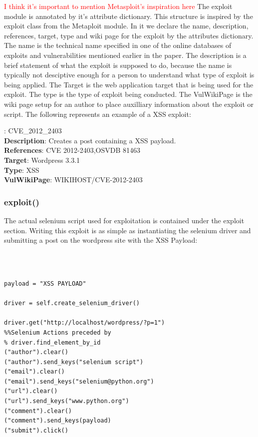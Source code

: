 \documentclass[letterpaper,twocolumn,10pt]{article}
\begin{document}
\textcolor{red}{I think it's important to mention Metasploit's inspiration here}
The exploit module is annotated by it's attribute dictionary. This structure is inspired by the exploit class from the Metaploit module. In it we declare the name, description, references, target, type and wiki page for the exploit by the attributes dictionary.  The name is the technical name specified in one of the online databases of exploits and vulnerabilities mentioned earlier in the paper.  The description is a brief statement of what the exploit is supposed to do, because the name is typically not desciptive enough for a person to understand what type of exploit is being applied.  The Target is the web application target that is being used for the exploit.  The type is the type of exploit being conducted.  The VulWikiPage is the wiki page setup for an author to place auxilliary information about the exploit or script.  The following represents an example of a XSS exploit:\\

{\tt \small

:	CVE\_2012\_2403\\
{\bf Description}:		Creates a post containing a XSS payload.\\
{\bf References}:	CVE 2012-2403,OSVDB 81463 \\
{\bf Target}: 		Wordpress 3.3.1\\
{\bf Type}: 		XSS\\
{\bf VulWikiPage}: WIKIHOST/CVE-2012-2403

}

\subsubsection{exploit()}

The actual selenium script used for exploitation is contained under the exploit section.  Writing this exploit is as simple as instantiating the selenium driver and submitting a post on the wordpress site with the XSS Payload: 

{\tt \footnotesize
\begin{verbatim}

payload = "XSS PAYLOAD"

driver = self.create_selenium_driver()

driver.get("http://localhost/wordpress/?p=1")
%%Selenium Actions preceded by
% driver.find_element_by_id
("author").clear()
("author").send_keys("selenium script")
("email").clear()
("email").send_keys("selenium@python.org")
("url").clear()
("url").send_keys("www.python.org")
("comment").clear()
("comment").send_keys(payload)
("submit").click()

\end{verbatim}
}
\end{document}

